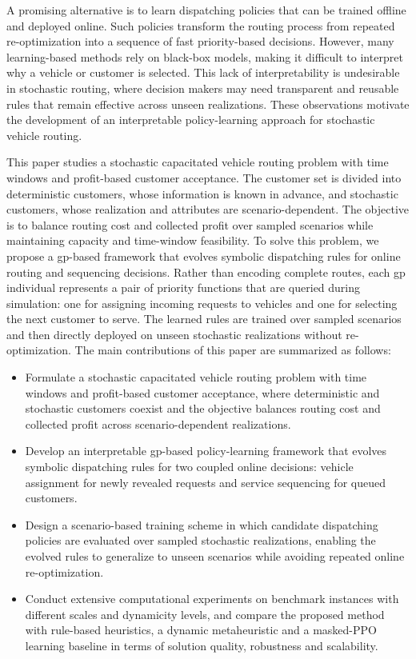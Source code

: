 \documentclass[pdflatex]{sn-jnl}
\begin{document}
A promising alternative is to learn dispatching policies that can be trained offline and deployed online. Such policies transform the routing process from repeated re-optimization into a sequence of fast priority-based decisions. However, many learning-based methods rely on black-box models, making it difficult to interpret why a vehicle or customer is selected. This lack of interpretability is undesirable in stochastic routing, where decision makers may
need transparent and reusable rules that remain effective across unseen
realizations. These observations motivate the development of an interpretable policy-learning approach for stochastic vehicle routing.

This paper studies a stochastic capacitated vehicle routing problem with time windows and profit-based customer acceptance. The customer set is divided into deterministic customers, whose information is known in advance, and stochastic customers, whose realization and attributes are scenario-dependent. The objective is to balance routing cost and collected profit over sampled scenarios while maintaining capacity and time-window feasibility. To solve this problem, we propose a \gls{gp}-based framework that evolves symbolic dispatching rules for online routing and sequencing decisions. Rather than
encoding complete routes, each \gls{gp} individual represents a pair of
priority functions that are queried during simulation: one for assigning incoming requests to vehicles and one for selecting the next customer to serve. The learned rules are trained over sampled scenarios and then directly deployed on unseen stochastic realizations without re-optimization. The main contributions of this paper are summarized as follows:

\begin{itemize}
    \item Formulate a stochastic capacitated vehicle routing problem with time windows and profit-based customer acceptance, where deterministic and stochastic customers coexist and the objective balances routing cost and collected profit across scenario-dependent realizations.

    \item Develop an interpretable \gls{gp}-based policy-learning framework that evolves symbolic dispatching rules for two coupled online decisions: vehicle assignment for newly revealed requests and service sequencing for queued customers.

    \item Design a scenario-based training scheme in which candidate
    dispatching policies are evaluated over sampled stochastic realizations, enabling the evolved rules to generalize to unseen scenarios while avoiding repeated online re-optimization.

    \item Conduct extensive computational experiments on benchmark
    instances with different scales and dynamicity levels, and compare the proposed method with rule-based heuristics, a dynamic metaheuristic and a masked-PPO learning baseline in terms of solution quality, robustness and scalability.
\end{itemize}
\end{document}
